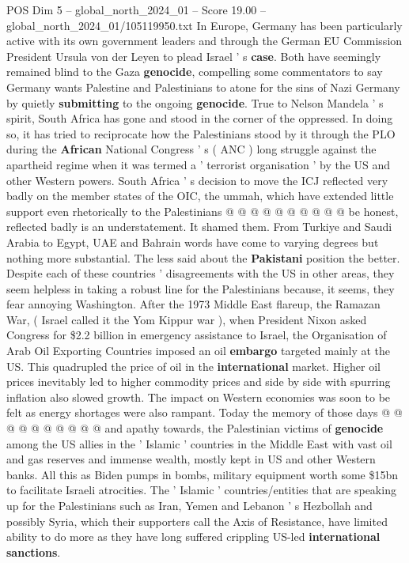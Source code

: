 \begin{textsample}{POS Dim 5 – global\_north\_2024\_01 – Score 19.00 – global\_north\_2024\_01/105119950.txt}
In Europe, Germany has been particularly active with its own government leaders and through the German EU Commission President Ursula von der Leyen to plead Israel ' s \textbf{case}.
Both have seemingly remained blind to the Gaza \textbf{genocide}, compelling some commentators to say Germany wants Palestine and Palestinians to atone for the sins of Nazi Germany by quietly \textbf{submitting} to the ongoing \textbf{genocide}.
True to Nelson Mandela ' s spirit, South Africa has gone and stood in the corner of the oppressed.
In doing so, it has tried to reciprocate how the Palestinians stood by it through the PLO during the \textbf{African} National Congress ' s ( ANC ) long struggle against the apartheid regime when it was termed a ' terrorist organisation ' by the US and other Western powers.
South Africa ' s decision to move the ICJ reflected very badly on the member states of the OIC, the ummah, which have extended little support even rhetorically to the Palestinians @ @ @ @ @ @ @ @ @ @ be honest, reflected badly is an understatement.
It shamed them.
From Turkiye and Saudi Arabia to Egypt, UAE and Bahrain words have come to varying degrees but nothing more substantial.
The less said about the \textbf{Pakistani} position the better.
Despite each of these countries ' disagreements with the US in other areas, they seem helpless in taking a robust line for the Palestinians because, it seems, they fear annoying Washington.
After the 1973 Middle East flareup, the Ramazan War, ( Israel called it the Yom Kippur war ), when President Nixon asked Congress for \$2.2 billion in emergency assistance to Israel, the Organisation of Arab Oil Exporting Countries imposed an oil \textbf{embargo} targeted mainly at the US.
This quadrupled the price of oil in the \textbf{international} market.
Higher oil prices inevitably led to higher commodity prices and side by side with spurring inflation also slowed growth.
The impact on Western economies was soon to be felt as energy shortages were also rampant.
Today the memory of those days @ @ @ @ @ @ @ @ @ @ and apathy towards, the Palestinian victims of \textbf{genocide} among the US allies in the ' Islamic ' countries in the Middle East with vast oil and gas reserves and immense wealth, mostly kept in US and other Western banks.
All this as Biden pumps in bombs, military equipment worth some \$15bn to facilitate Israeli atrocities.
The ' Islamic ' countries/entities that are speaking up for the Palestinians such as Iran, Yemen and Lebanon ' s Hezbollah and possibly Syria, which their supporters call the Axis of Resistance, have limited ability to do more as they have long suffered crippling US-led \textbf{international} \textbf{sanctions}.

\end{textsample}
